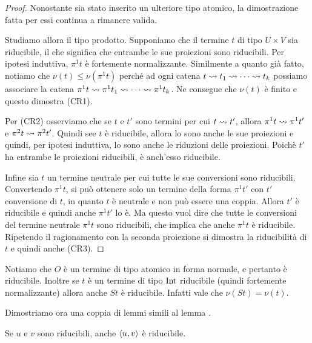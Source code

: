 \documentclass[]{marticle}
\begin{document}
\begin{proof}
    Nonostante sia stato inserito un ulteriore tipo atomico, la dimostrazione
    fatta per essi continua a rimanere valida.

    Studiamo allora il tipo prodotto. Supponiamo che il termine $t$ di tipo
    $U\times V$ sia riducibile, il che significa che entrambe le sue proiezioni
    sono riducibili. Per ipotesi induttiva, $\pi^1 t$ \`e fortemente
    normalizzante. Similmente a quanto gi\`a fatto, notiamo che $\nu(t)\leq
    \nu(\pi^1 t)$ perch\'e ad ogni catena $t \rightsquigarrow t_1 \rightsquigarrow \cdots \rightsquigarrow t_k$
    possiamo associare la catena $\pi^1 t \rightsquigarrow \pi^1 t_1\rightsquigarrow \cdots \rightsquigarrow
    \pi^1 t_k$. Ne consegue che $\nu(t)$ \`e finito e questo dimostra (CR1).

    Per (CR2) osserviamo che se $t$ e $t'$ sono termini per cui $t \rightsquigarrow t'$,
    allora $\pi^1 t \rightsquigarrow \pi^1 t'$ e $\pi^2 t \rightsquigarrow \pi^2 t'$. Quindi see $t$
    \`e riducibile, allora lo sono anche le sue proiezioni e quindi, per ipotesi
    induttiva, lo sono anche le riduzioni delle proiezioni. Poich\`e $t'$ ha
    entrambe le proiezioni riducibili, \`e anch'esso riducibile.

    Infine sia $t$ un termine neutrale per cui tutte le sue conversioni sono
    riducibili.  Convertendo $\pi^1 t$, si pu\`o ottenere solo un termine della
    forma $\pi^1 t'$ con $t'$ conversione di $t$, in quanto $t$ \`e neutrale e
    non pu\`o essere una coppia. Allora $t'$ \`e riducibile e quindi anche
    $\pi^1 t'$ lo \`e. Ma questo vuol dire che tutte le conversioni del termine
    neutrale $\pi^1 t$ sono riducibili, che implica che anche $\pi^1 t$ \`e
    riducibile. Ripetendo il ragionamento con la seconda proiezione si dimostra
    la riducibilit\`a di $t$ e quindi anche (CR3).
\end{proof}

Notiamo che $O$ \`e un termine di tipo atomico in forma normale, e pertanto \`e
riducibile. Inoltre se $t$ \`e un termine di tipo $\text{Int}$ riducibile (quindi
fortemente normalizzante) allora anche $St$ \`e riducibile. Infatti vale che
$\nu(St)=\nu(t)$.

Dimostriamo ora una coppia di lemmi simili al lemma .

\begin{block}[Lemma]
    Se $u$ e $v$ sono riducibili, anche $\langle u,v \rangle$ \`e riducibile.
\end{block}
\end{document}
